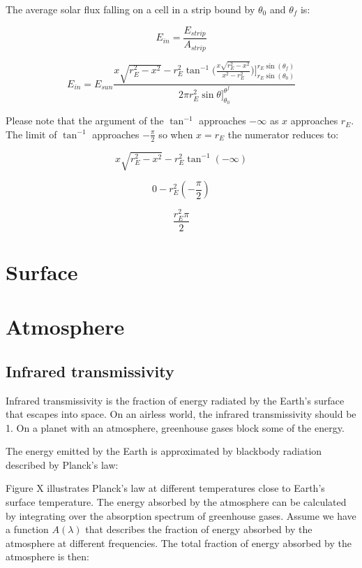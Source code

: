 \documentclass[12pt]{article} %
\begin{document}
The average solar flux falling on a cell in a strip bound by $\theta_0$ and $\theta_f$ is:

$$E_{in} = \frac{E_{strip}}{A_{strip}}$$

$$\boxed{E_{in} = E_{sun}\frac{x \sqrt{r_{E}^2 - x^2} -  r_{E}^2 \tan^{-1}\bigg({\frac{x \sqrt{r_{E}^2 - x^2}}{x^2 - r_{E}^2 }}\bigg)\bigg]_{r_{E}\sin(\theta_0)}^{r_{E}\sin(\theta_f)}}{2 \pi r_{E}^2 \sin{\theta}]_{\theta_0}^{\theta^f}}}$$

Please note that the argument of the $\tan^{-1}$ approaches $-\infty$ as $x$ approaches $r_{E}$. The limit of $\tan^{-1}$ approaches $-\frac{\pi}{2}$ so when $x = r_{E}$ the numerator reduces to:

$$x \sqrt{r_{E}^2 - x^2} -  r_{E}^2 \tan^{-1}(-\infty)$$

$$0 -  r_{E}^2 (-\frac{\pi}{2})$$

$$\frac{r_{E}^2 \pi}{2}$$

\newpage
\section{Surface}
\label{sec:surface}


\newpage
\section{Atmosphere}
\label{sec:atmos}


\subsection{Infrared transmissivity}

Infrared transmissivity is the fraction of energy radiated by the Earth's surface that escapes into space. On an airless world, the infrared transmissivity should be 1. On a planet with an atmosphere, greenhouse gases block some of the energy.

The energy emitted by the Earth is approximated by blackbody radiation described by Planck's law:

Figure X illustrates Planck's law at different temperatures close to Earth's surface temperature. The energy absorbed by the atmosphere can be calculated by integrating over the absorption spectrum of greenhouse gases. Assume we have a function $A(\lambda)$ that describes the fraction of energy absorbed by the atmosphere at different frequencies. The total fraction of energy absorbed by the atmosphere is then:
\end{document}
